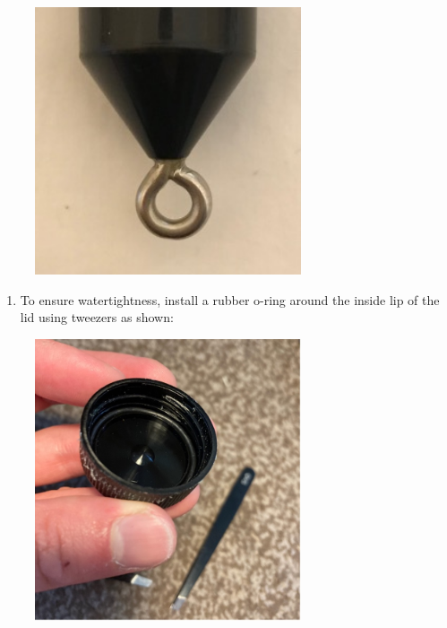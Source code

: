 \documentclass[
  letterpaper,
  DIV=11,
  numbers=noendperiod]{scrreprt}
\providecommand{\tightlist}{%
  \setlength{\itemsep}{0pt}\setlength{\parskip}{0pt}}\usepackage{longtable,booktabs,array}
\begin{document}
\begin{figure}

{\centering \includegraphics[width=0.7\textwidth,height=\textheight]{chapters/figs/B4pEyeHook.jpg}

}

\end{figure}

\begin{enumerate}
\def\labelenumi{\arabic{enumi}.}
\setcounter{enumi}{6}
\tightlist
\item
  To ensure watertightness, install a rubber o-ring around the inside
  lip of the lid using tweezers as shown:
\end{enumerate}

\begin{figure}

{\centering \includegraphics[width=0.7\textwidth,height=\textheight]{chapters/figs/B4pLidSeal.jpg}

}

\end{figure}
\end{document}
